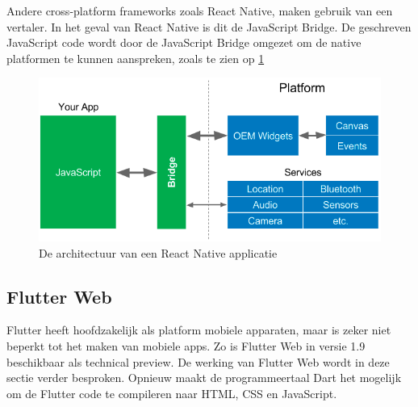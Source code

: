 Andere cross-platform frameworks zoals React Native, maken gebruik van een vertaler. In het geval van React Native is dit de JavaScript Bridge. De geschreven JavaScript code wordt door de JavaScript Bridge omgezet om de native platformen te kunnen aanspreken, zoals te zien op \ref{fig:react-native-app-architecture}  \autocite{Kuitunen2019}

\begin{figure}[H]
    \centering
    \includegraphics[width=\figureWidthModifier\linewidth]{img/stand-van-zaken/react-native-app-architecture.png}
    \caption{De architectuur van een React Native applicatie}
    \label{fig:react-native-app-architecture}
\end{figure}


\subsection{Flutter Web}
Flutter heeft hoofdzakelijk als platform mobiele apparaten, maar is zeker niet beperkt tot het maken van mobiele apps. Zo is Flutter Web in versie 1.9 beschikbaar als technical preview. De werking van Flutter Web wordt in deze sectie verder besproken.
\newline
Opnieuw maakt de programmeertaal Dart het mogelijk om de Flutter code te compileren naar HTML, CSS en JavaScript.


